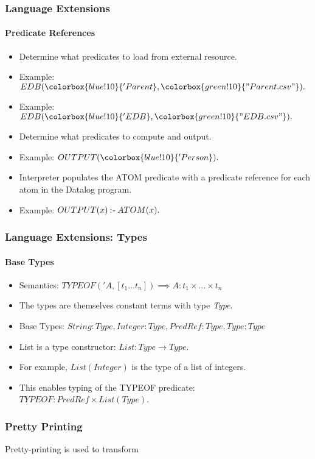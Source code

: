 \documentclass{beamer}
\newcommand{\coloneqtwo}{\mathbin{:\hspace{-0.5ex}\textsf{-}}}
\newcommand{\strconst}[1]{ \colorbox{green!10}{#1} }
\newcommand{\predconst}[1]{ \colorbox{blue!10}{#1} }
\begin{document}
\begin{frame}
\frametitle{Language Extensions}
\framesubtitle{Predicate References}
\begin{itemize}
\item<3->Determine what predicates to load from external resource.
\item<4->Example: $EDB(\predconst{'Parent}, \strconst{"Parent.csv"}).$
\item<5->Example: $EDB(\predconst{'EDB}, \strconst{"EDB.csv"}).$
\end{itemize}

\begin{itemize}
\item<7->Determine what predicates to compute and output. 
\item<8->Example: $OUTPUT(\predconst{'Person}). $
\end{itemize}

\begin{itemize}
\item<10->Interpreter populates the ATOM predicate with a predicate reference for each atom in the Datalog program.
\item<11->Example: $OUTPUT(x) \coloneqtwo ATOM(x).$
\end{itemize}
\end{frame}
\begin{frame}
\frametitle{Language Extensions: Types}
\framesubtitle{Base Types}
\begin{itemize}
\item<2-> Semantics:  $TYPEOF('A, [t_1  \ldots  t_n]) \implies A : t_1 \times \ldots \times t_n$
\item<3-> The types are themselves constant terms with type \textit{Type}.
\item<4-> Base Types: $String : Type, Integer : Type, PredRef : Type, Type : Type$
\item<5-> List is a type constructor: $List : Type \rightarrow Type$.
\item<6-> For example,  $List(Integer)$ is the type of a list of integers.
\item<7-> This enables typing of the TYPEOF predicate: $TYPEOF: PredRef \times List(Type)$.
\end{itemize}
\end{frame}

\begin{frame}
\frametitle{Pretty Printing}
Pretty-printing is used to transform 
\end{frame}
\end{document}
